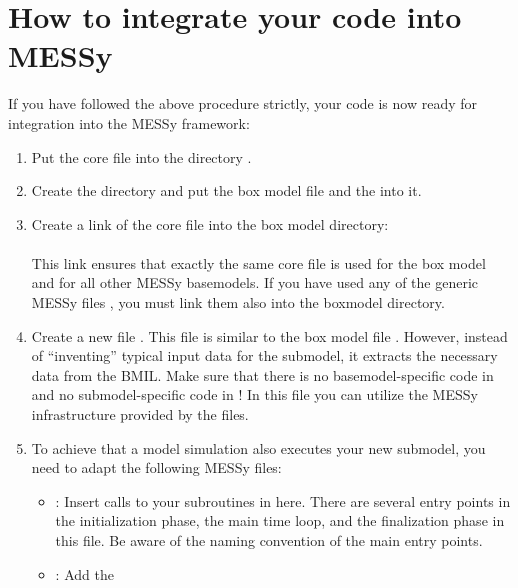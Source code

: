 \documentclass[a4paper,12pt,twoside]{article}
\def\nosep{\setlength\parsep{0mm}\setlength\topsep{0mm}\setlength\itemsep{0mm}}
\begin{document}
\section{How to integrate your code into MESSy}

If you have followed the above procedure strictly, your code is now
ready for integration into the MESSy framework:

\begin{enumerate}\nosep
\item Put the core file  into the
  directory .
\item Create the directory \code{/} and put
  the box model file  and the
   into it.
\item Create a link of the core file into the box model directory:\\
    
  \code{/}\\
  This link ensures that exactly the same core file is used for the box
  model and for all other MESSy basemodels.
  If you have used any of the generic MESSy
  files ,
  you must link them also into the boxmodel directory.
\item Create a new file . This file is similar to the box model file
  . However, instead of
  ``inventing'' typical input data for the submodel, it extracts the
  necessary data from the BMIL. Make sure that there is no
  basemodel-specific code in 
  and no submodel-specific code in ! In this file you can utilize the MESSy infrastructure
  provided by the  files.
\item To achieve that a model simulation also executes your new
  submodel, you need to adapt the following MESSy files:
  \begin{itemize}
  \item {}: Insert calls
    to your subroutines in  here.
    There are several entry points in the initialization phase, the main time
    loop, and the finalization phase in this file. Be aware of the naming
    convention of the main entry points.
  \item {}: Add the

\end{itemize}
\end{enumerate}
\end{document}
